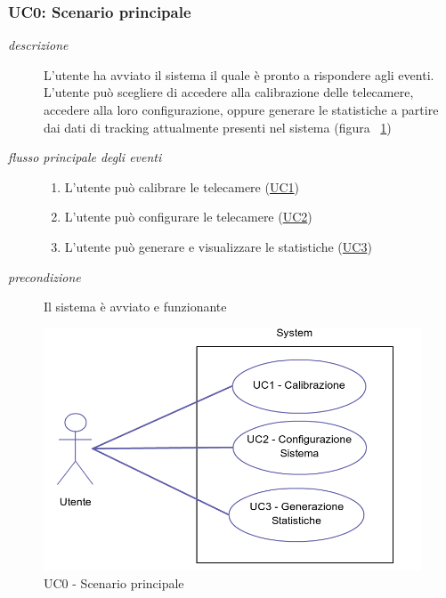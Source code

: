 \subsubsection{UC0: Scenario principale} \label{sec:UC0}
\begin{description}
\item[\em{descrizione }]L'utente ha avviato il sistema il quale è pronto a rispondere agli eventi. L'utente può scegliere di accedere alla calibrazione delle telecamere, accedere alla loro configurazione, oppure generare le statistiche a partire dai dati di tracking attualmente presenti nel sistema (figura ~\ref{fig:uc0})
\item[\em{flusso principale degli eventi }] \mbox{}
\begin{enumerate}
\item L'utente può calibrare le telecamere (\hyperref[sec:uc1]{UC1}) 
\item L'utente può configurare le telecamere (\hyperref[sec:uc2]{UC2})
\item L'utente può generare e visualizzare le statistiche (\hyperref[sec:uc3]{UC3})
\end{enumerate}
\item[\em{precondizione }] Il sistema è avviato e funzionante
\end{description}

\begin{figure}[htpb] 
\centering 
\includegraphics[scale=0.4]{./images/uc0.png} 
\caption{UC0 - Scenario principale} 
\label{fig:uc0}
\end{figure} 


